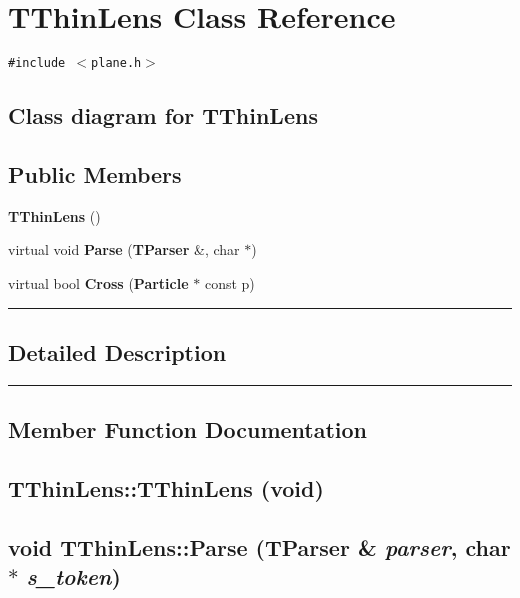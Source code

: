 \section{TThinLens  Class Reference}
\label{TThinLens}


{\tt \#include $<$plane.h$>$}

\subsection*{Class diagram for TThinLens}
\begin{figure}[H]
\begin{center}
\leavevmode
\setlength{\epsfysize}{2cm}
\end{center}
\end{figure}
\subsection*{Public Members}
\begin{CompactItemize}
\item 
{\bf TThin\-Lens} ()
\item 
virtual void {\bf Parse} ({\bf TParser} \&, char $\ast$)
\item 
virtual bool {\bf Cross} ({\bf Particle} $\ast$ const p)
\end{CompactItemize}
\vspace{0.4cm}\hrule\vspace{0.2cm}
\subsection*{Detailed Description}
\vspace{0.4cm}\hrule\vspace{0.2cm}
\subsection*{Member Function Documentation}
\label{TThinLens_a0}
\subsection{\setlength{\rightskip}{0pt plus 5cm}TThin\-Lens::TThin\-Lens (void)}

\label{TThinLens_a1}
\subsection{\setlength{\rightskip}{0pt plus 5cm}void TThin\-Lens::Parse ({\bf TParser} \& {\em parser}, char $\ast$ {\em s\_\-token})\hspace{0.3cm}{\tt  [virtual]}}



